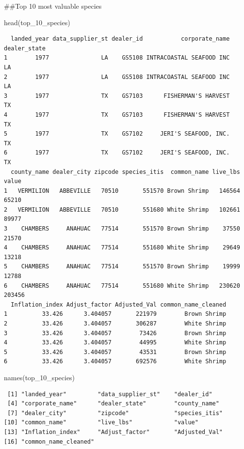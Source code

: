 \documentclass[
  letterpaper,
  DIV=11,
  numbers=noendperiod]{scrartcl}
\newenvironment{Shaded}{\begin{snugshade}}{\end{snugshade}}
\newcommand{\FunctionTok}[1]{\textcolor[rgb]{0.28,0.35,0.67}{#1}}
\newcommand{\NormalTok}[1]{\textcolor[rgb]{0.00,0.23,0.31}{#1}}
\begin{document}
\#\#Top 10 most valuable species

\begin{Shaded}
\begin{Highlighting}[]
\FunctionTok{head}\NormalTok{(top\_10\_species)}
\end{Highlighting}
\end{Shaded}

\begin{verbatim}
  landed_year data_supplier_st dealer_id           corporate_name dealer_state
1        1977               LA    GS5108 INTRACOASTAL SEAFOOD INC           LA
2        1977               LA    GS5108 INTRACOASTAL SEAFOOD INC           LA
3        1977               TX    GS7103      FISHERMAN'S HARVEST           TX
4        1977               TX    GS7103      FISHERMAN'S HARVEST           TX
5        1977               TX    GS7102     JERI'S SEAFOOD, INC.           TX
6        1977               TX    GS7102     JERI'S SEAFOOD, INC.           TX
  county_name dealer_city zipcode species_itis  common_name live_lbs  value
1   VERMILION   ABBEVILLE   70510       551570 Brown Shrimp   146564  65210
2   VERMILION   ABBEVILLE   70510       551680 White Shrimp   102661  89977
3    CHAMBERS     ANAHUAC   77514       551570 Brown Shrimp    37550  21570
4    CHAMBERS     ANAHUAC   77514       551680 White Shrimp    29649  13218
5    CHAMBERS     ANAHUAC   77514       551570 Brown Shrimp    19999  12788
6    CHAMBERS     ANAHUAC   77514       551680 White Shrimp   230620 203456
  Inflation_index Adjust_factor Adjusted_Val common_name_cleaned
1          33.426      3.404057       221979        Brown Shrimp
2          33.426      3.404057       306287        White Shrimp
3          33.426      3.404057        73426        Brown Shrimp
4          33.426      3.404057        44995        White Shrimp
5          33.426      3.404057        43531        Brown Shrimp
6          33.426      3.404057       692576        White Shrimp
\end{verbatim}

\begin{Shaded}
\begin{Highlighting}[]
\FunctionTok{names}\NormalTok{(top\_10\_species)}
\end{Highlighting}
\end{Shaded}

\begin{verbatim}
 [1] "landed_year"         "data_supplier_st"    "dealer_id"          
 [4] "corporate_name"      "dealer_state"        "county_name"        
 [7] "dealer_city"         "zipcode"             "species_itis"       
[10] "common_name"         "live_lbs"            "value"              
[13] "Inflation_index"     "Adjust_factor"       "Adjusted_Val"       
[16] "common_name_cleaned"
\end{verbatim}
\end{document}
